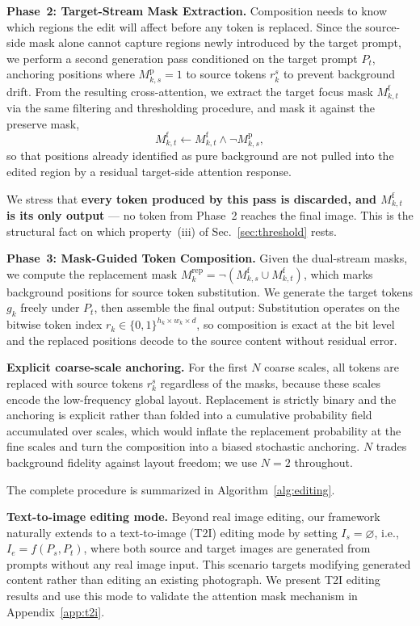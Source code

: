 \noindent\textbf{Phase~2: Target-Stream Mask Extraction.}
Composition needs to know which regions the edit will affect before any token is replaced. Since the source-side mask alone cannot capture regions newly introduced by the target prompt, we perform a second generation pass conditioned on the target prompt $P_t$, anchoring positions where $M_{k,s}^{\mathrm{p}} = 1$ to source tokens $r_k^s$ to prevent background drift. From the resulting cross-attention, we extract the target focus mask $M_{k,t}^{\mathrm{f}}$ via the same filtering and thresholding procedure, and mask it against the preserve mask,
\begin{equation}
    M_{k,t}^{\mathrm{f}} \leftarrow M_{k,t}^{\mathrm{f}} \wedge \neg M_{k,s}^{\mathrm{p}},
    \label{eq:target_focus_gate}
\end{equation}
so that positions already identified as pure background are not pulled into the edited region by a residual target-side attention response.

We stress that \textbf{every token produced by this pass is discarded, and $M_{k,t}^{\mathrm{f}}$ is its only output} --- no token from Phase~2 reaches the final image. This is the structural fact on which property~(iii) of Sec.~\ref{sec:threshold} rests.

\noindent\textbf{Phase~3: Mask-Guided Token Composition.}
Given the dual-stream masks, we compute the replacement mask $M_k^{\mathrm{rep}} = \neg(M_{k,s}^{\mathrm{f}} \cup M_{k,t}^{\mathrm{f}})$, which marks background positions for source token substitution. We generate the target tokens $g_k$ freely under $P_t$, then assemble the final output:
\EqTokenReplace
Substitution operates on the bitwise token index $r_k \in \{0,1\}^{h_k \times w_k \times d}$, so composition is exact at the bit level and the replaced positions decode to the source content without residual error.

\noindent\textbf{Explicit coarse-scale anchoring.}
For the first $N$ coarse scales, all tokens are replaced with source tokens $r_k^s$ regardless of the masks, because these scales encode the low-frequency global layout. Replacement is strictly binary and the anchoring is explicit rather than folded into a cumulative probability field accumulated over scales, which would inflate the replacement probability at the fine scales and turn the composition into a biased stochastic anchoring. $N$ trades background fidelity against layout freedom; we use $N=2$ throughout.

The complete procedure is summarized in Algorithm~\ref{alg:editing}.



\noindent\textbf{Text-to-image editing mode.}
Beyond real image editing, our framework naturally extends to a text-to-image (T2I) editing mode by setting $I_s = \varnothing$, i.e., $I_e = f(P_s, P_t)$, where both source and target images are generated from prompts without any real image input. This scenario targets modifying generated content rather than editing an existing photograph. We present T2I editing results and use this mode to validate the attention mask mechanism in Appendix~\ref{app:t2i}.
